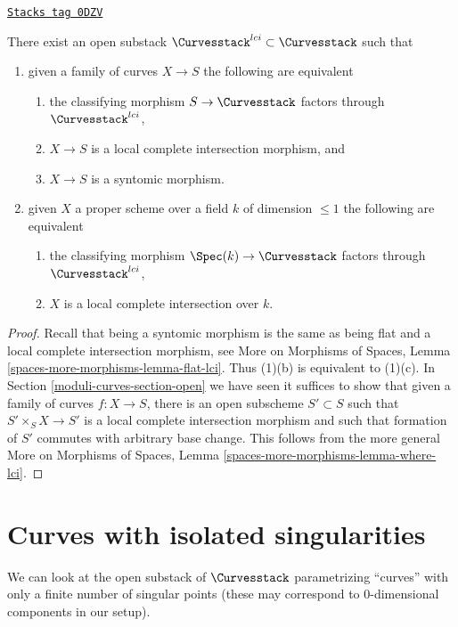 \begin{lemma}
\label{moduli-curves-lemma-lci-curves}
\href{https://stacks.math.columbia.edu/tag/0DZV}{\texttt{Stacks tag 0DZV}}

There exist an open substack $\Curvesstack^{lci} \subset \Curvesstack$
such that
\begin{enumerate}
\item given a family of curves $X \to S$ the following are equivalent
\begin{enumerate}
\item the classifying morphism $S \to \Curvesstack$ factors through
$\Curvesstack^{lci}$,
\item $X \to S$ is a local complete intersection morphism, and
\item $X \to S$ is a syntomic morphism.
\end{enumerate}
\item given $X$ a proper scheme over a field $k$ of dimension $\leq 1$
the following are equivalent
\begin{enumerate}
\item the classifying morphism $\Spec(k) \to \Curvesstack$ factors
through $\Curvesstack^{lci}$,
\item $X$ is a local complete intersection over $k$.
\end{enumerate}
\end{enumerate}
\end{lemma}

\begin{proof}
Recall that being a syntomic morphism is the same as being flat and
a local complete intersection morphism, see
More on Morphisms of Spaces, Lemma \ref{spaces-more-morphisms-lemma-flat-lci}.
Thus (1)(b) is equivalent to (1)(c).
In Section \ref{moduli-curves-section-open} we have seen
it suffices to show that given a family of curves
$f : X \to S$, there is an open subscheme $S' \subset S$
such that $S' \times_S X \to S'$ is a local complete intersection
morphism and such that formation of $S'$ commutes with arbitrary base change.
This follows from the more general
More on Morphisms of Spaces, Lemma \ref{spaces-more-morphisms-lemma-where-lci}.
\end{proof}

\section{Curves with isolated singularities}
\label{moduli-curves-section-curves-isolated}
We can look at the open substack of $\Curvesstack$
parametrizing ``curves'' with only a finite number of singular
points (these may correspond to $0$-dimensional components
in our setup).

